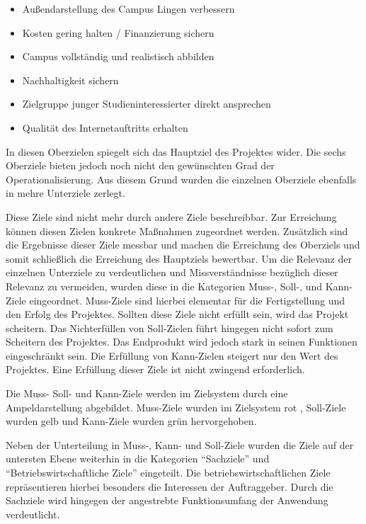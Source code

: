 \begin{itemize}
  \item Außendarstellung des Campus Lingen verbessern
  \item Kosten gering halten / Finanzierung sichern
  \item Campus vollständig und realistisch abbilden
  \item Nachhaltigkeit sichern
  \item Zielgruppe junger Studieninteressierter direkt ansprechen
  \item Qualität des Internetauftritts erhalten
\end{itemize}

In diesen Oberzielen spiegelt sich das Hauptziel des Projektes wider. Die
sechs Oberziele bieten jedoch noch nicht den gewünschten Grad der
Operationalisierung. Aus diesem Grund wurden die einzelnen Oberziele ebenfalls
in mehre Unterziele zerlegt.

Diese Ziele sind nicht mehr durch andere Ziele beschreibbar. Zur Erreichung
können diesen Zielen konkrete Maßnahmen zugeordnet werden. Zusätzlich sind die
Ergebnisse dieser Ziele messbar und machen die Erreichung des Oberziels und
somit schließlich die Erreichung des Hauptziels bewertbar. Um die Relevanz der
einzelnen Unterziele zu verdeutlichen und Missverständnisse bezüglich dieser
Relevanz zu vermeiden, wurden diese in die Kategorien Muss-, Soll-, und
Kann-Ziele eingeordnet. Muss-Ziele sind hierbei elementar für die
Fertigstellung und den Erfolg des Projektes. Sollten diese Ziele nicht erfüllt
sein, wird das Projekt scheitern. Das Nichterfüllen von Soll-Zielen führt
hingegen nicht sofort zum Scheitern des Projektes. Das Endprodukt wird jedoch
stark in seinen Funktionen eingeschränkt sein. Die Erfüllung von Kann-Zielen
steigert nur den Wert des Projektes. Eine Erfüllung dieser Ziele ist nicht
zwingend erforderlich.

Die Muss- Soll- und Kann-Ziele werden im Zielsystem durch eine Ampeldarstellung
abgebildet.  Muss-Ziele wurden im Zielsystem rot , Soll-Ziele
wurden gelb und Kann-Ziele wurden grün hervorgehoben.

Neben der Unterteilung in Muss-, Kann- und Soll-Ziele wurden die Ziele auf der
untersten Ebene weiterhin in die Kategorien "`Sachziele"' und
"`Betriebswirtschaftliche Ziele"' eingeteilt. Die betriebswirtschaftlichen
Ziele repräsentieren hierbei besonders die Interessen der Auftraggeber. Durch
die Sachziele wird hingegen der angestrebte Funktionsumfang der Anwendung
verdeutlicht.

